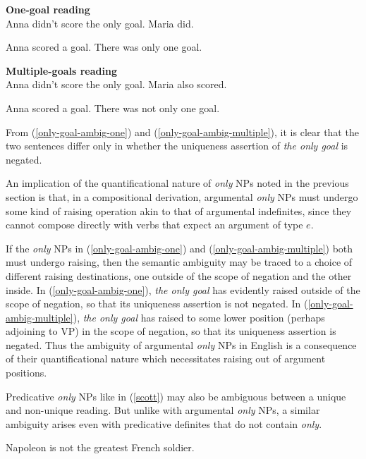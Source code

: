 \begin{exe}
	\ex \label{only-goal-ambig-one} \textbf{One-goal reading} \\ Anna didn't score the only goal. Maria did.
	\begin{xlist}
		\ex Anna scored a goal.
		\ex There was only one goal.
	\end{xlist}

	\ex \label{only-goal-ambig-multiple} \textbf{Multiple-goals reading} \\ Anna didn't score the only goal. Maria also scored.
	\begin{xlist}
		\ex Anna scored a goal.
		\ex There was not only one goal.
	\end{xlist}
\end{exe}

From (\ref{only-goal-ambig-one}) and (\ref{only-goal-ambig-multiple}), it is clear that the two sentences differ only in whether the uniqueness assertion of \textit{the only goal} is negated.

An implication of the quantificational nature of \textit{only} NPs noted in the previous section is that, in a compositional derivation, argumental \textit{only} NPs must undergo some kind of raising operation akin to that of argumental indefinites, since they cannot compose directly with verbs that expect an argument of type $e$.

If the \textit{only} NPs in (\ref{only-goal-ambig-one}) and (\ref{only-goal-ambig-multiple}) both must undergo raising, then the semantic ambiguity may be traced to a choice of different raising destinations, one outside of the scope of negation and the other inside. In (\ref{only-goal-ambig-one}), \textit{the only goal} has evidently raised outside of the scope of negation, so that its uniqueness assertion is not negated. In (\ref{only-goal-ambig-multiple}), \textit{the only goal} has raised to some lower position (perhaps adjoining to VP) in the scope of negation, so that its uniqueness assertion is negated. Thus the ambiguity of argumental \textit{only} NPs in English is a consequence of their quantificational nature which necessitates raising out of argument positions.

Predicative \textit{only} NPs like in (\ref{scott}) may also be ambiguous between a unique and non-unique reading. But unlike with argumental \textit{only} NPs, a similar ambiguity arises even with predicative definites that do not contain \textit{only}.

\begin{exe}
	\ex \label{napoleon} Napoleon is not the greatest French soldier.
\end{exe}

